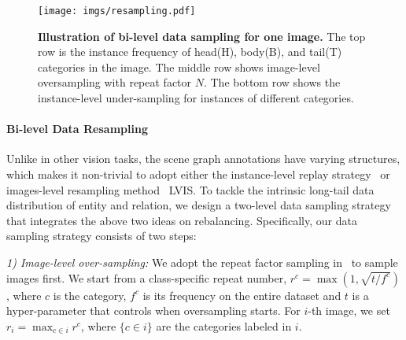 \begin{figure}
	\centering
	\texttt{[image: imgs/resampling.pdf]}
	\caption{
        \textbf{Illustration of bi-level data sampling for one image.} The top row is the instance frequency of head(H), body(B), and tail(T) categories in the image.
        The middle row shows image-level oversampling with repeat factor $N$. The bottom row shows the instance-level under-sampling for instances of different categories. 
	} 
	\label{data_sampling}
    \vspace{-4mm}
\end{figure}

\vspace{-4mm}
\paragraph{Bi-level Data Resampling}
Unlike in other vision tasks, the scene graph annotations have varying structures, which makes it non-trivial to adopt either the instance-level replay strategy~\cite{hu_learning_2020} or images-level resampling method ~LVIS\cite{gupta_lvis:_2019}.
To tackle the intrinsic long-tail data distribution of entity and relation, we design a two-level data sampling strategy that integrates the above two ideas on rebalancing.  
Specifically, our data sampling strategy consists of two steps: 

\noindent\textit{1) Image-level over-sampling:} We adopt the {repeat factor sampling} in~\cite{gupta_lvis:_2019} to sample images first. We start from a class-specific repeat number, $r^c=\max(1,\sqrt{t/f^c})$, where $c$ is the category, $f^c$ is its frequency on the entire dataset and $t$ is a hyper-parameter that controls when oversampling starts. 
For $i$-th image, we set $r_i = \max_{c \in i} r^c$, where $\{c \in i\}$ are the categories labeled in $i$.


